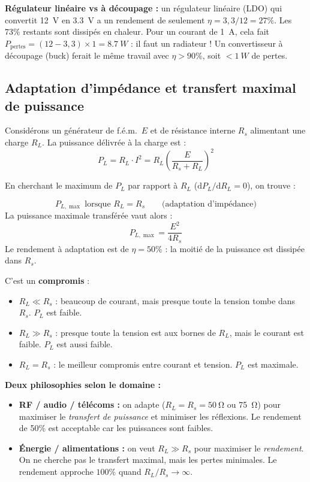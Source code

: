 \documentclass[12pt,a4paper,twoside]{book}
\begin{document}
\begin{attention}
\textbf{Régulateur linéaire vs à découpage :} un régulateur linéaire (LDO) qui convertit \SI{12}{V} en \SI{3.3}{V} a un rendement de seulement $\eta = 3{,}3/12 = 27\%$. Les $73\%$ restants sont dissipés en chaleur. Pour un courant de \SI{1}{A}, cela fait $P_{\text{pertes}} = (12-3{,}3)\times 1 = \SI{8.7}{W}$ : il faut un radiateur ! Un convertisseur à découpage (buck) ferait le même travail avec $\eta > 90\%$, soit $< \SI{1}{W}$ de pertes.
\end{attention}

\subsection{Adaptation d'impédance et transfert maximal de puissance}

Considérons un générateur de f.é.m.\ $E$ et de résistance interne $R_s$ alimentant une charge $R_L$. La puissance délivrée à la charge est :
\[
P_L = R_L \cdot I^2 = R_L \left(\frac{E}{R_s + R_L}\right)^2
\]

En cherchant le maximum de $P_L$ par rapport à $R_L$ ($\mathrm{d}P_L/\mathrm{d}R_L = 0$), on trouve :

\begin{formule}
\[
\boxed{P_{L,\max} \text{ lorsque } R_L = R_s} \qquad \text{(adaptation d'impédance)}
\]
La puissance maximale transférée vaut alors :
\[
P_{L,\max} = \frac{E^2}{4R_s}
\]
Le rendement à adaptation est de $\eta = 50\%$ : la moitié de la puissance est dissipée dans $R_s$.
\end{formule}

\begin{intuition}
C'est un \textbf{compromis} :
\begin{itemize}[nosep]
\item $R_L \ll R_s$ : beaucoup de courant, mais presque toute la tension tombe dans $R_s$. $P_L$ est faible.
\item $R_L \gg R_s$ : presque toute la tension est aux bornes de $R_L$, mais le courant est faible. $P_L$ est aussi faible.
\item $R_L = R_s$ : le meilleur compromis entre courant et tension. $P_L$ est maximale.
\end{itemize}
\end{intuition}

\begin{pratique}
\textbf{Deux philosophies selon le domaine :}
\begin{itemize}[nosep]
\item \textbf{RF / audio / télécoms :} on adapte ($R_L = R_s = \SI{50}{\ohm}$ ou \SI{75}{\ohm}) pour maximiser le \textit{transfert de puissance} et minimiser les réflexions. Le rendement de 50\% est acceptable car les puissances sont faibles.
\item \textbf{Énergie / alimentations :} on veut $R_L \gg R_s$ pour maximiser le \textit{rendement}. On ne cherche pas le transfert maximal, mais les pertes minimales. Le rendement approche $100\%$ quand $R_L/R_s \to \infty$.
\end{itemize}
\end{pratique}
\end{document}
